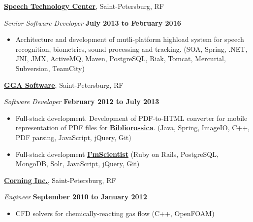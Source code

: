 \documentclass[10pt]{article}
\newcommand{\halfblankline}{\quad\vspace{-0.5\baselineskip}\pagebreak[3]}
\begin{document}
\halfblankline
\href{http://speechpro.com/}{\textbf{Speech Technology Center}}, Saint-Petersburg, RF
\begin{outerlist}
    \item[] \textit{Senior Software Developer}
            \hfill \textbf{July 2013 to February 2016}
            \begin{itemize}
               \item Architecture and development of mutli-platform highload system for speech recognition, biometrics, sound processing and tracking. (SOA, Spring, .NET, JNI, JMX, ActiveMQ, Maven, PostgreSQL, Riak, Tomcat, Mercurial, Subversion, TeamCity)
            \end{itemize}
\end{outerlist}
\vspace{0.2in}
\halfblankline
\href{http://www.ggasoftware.com}{\textbf{GGA Software}}, Saint-Petersburg, RF
\begin{outerlist}
    \item[] \textit{Software Developer}
            \hfill \textbf{February 2012 to July 2013}
            \begin{itemize}
               \item Full-stack development. Development of PDF-to-HTML converter for mobile representation of PDF files for \href{http://www.bibliorossica.com}{\textbf{Bibliorossica}}. (Java, Spring, ImageIO, C++, PDF parsing, JavaScript, jQuery, Git)
               \item Full-stack development \href{http://www.iamscientist.com}{\textbf{I'mScientist}} (Ruby on Rails,
               PostgreSQL, MongoDB, Solr, JavaScript, jQuery, Git)
            \end{itemize}

\end{outerlist}
\vspace{0.2in}
\halfblankline
\href{http://www.corning.com}{\textbf{Corning Inc.}}, Saint-Petersburg, RF
\begin{outerlist}
    \item[] \textit{Engineer}
            \hfill \textbf{September 2010 to January 2012}
            \begin{itemize}
                    \item CFD solvers for chemically-reacting gas flow (C++, OpenFOAM)
            \end{itemize}
\end{outerlist}
\end{document}
